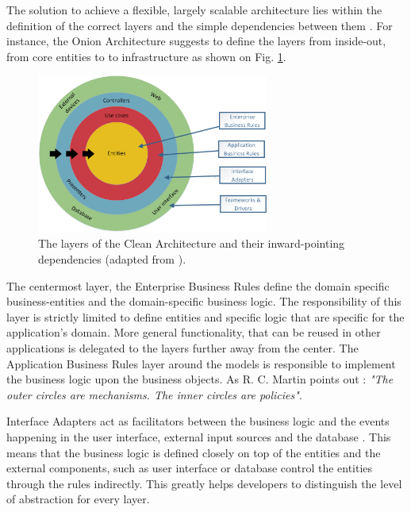 \documentclass[conference]{IEEEtran}
\begin{document}
The solution to achieve a flexible, largely scalable architecture lies within the definition of the correct layers and the simple dependencies between them \cite{cleanarchitecture} \cite{onionarchitecture}. For instance, the Onion Architecture \cite{onionarchitecture} suggests to define the layers from inside-out, from core entities to to infrastructure as shown on Fig. \ref{cleanachitecture_fig}. 

\begin{figure}[!t]
\centering
\includegraphics[width=3in]{images/cleanarchitecture.png}
\caption{The layers of the Clean Architecture and their inward-pointing dependencies (adapted from \cite{cleanarchitecture}).}
\label{cleanachitecture_fig}
\end{figure}

The centermost layer, the Enterprise Business Rules define the domain specific business-entities and the domain-specific business logic. The responsibility of this layer is strictly limited to define entities and specific logic that are specific for the application's domain. More general functionality, that can be reused in other applications is delegated to the layers further away from the center. The Application Business Rules layer around the models is responsible to implement the business logic upon the business objects. As R. C. Martin points out \cite{cleanarchitecture}: \textit{"The outer circles are mechanisms. The inner circles are policies"}. 

Interface Adapters act as facilitators between the business logic and the events happening in the user interface, external input sources and the database \cite{onionarchitecture} \cite{cleanarchitecture}. This means that the business logic is defined closely on top of the entities and the external components, such as user interface or database control the entities through the rules indirectly. This greatly helps developers to distinguish the level of abstraction for every layer. 
\end{document}

